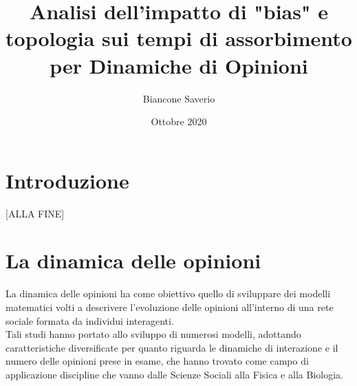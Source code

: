\documentclass{article}
\title{Analisi dell'impatto di "bias" e topologia sui tempi di assorbimento per Dinamiche di Opinioni}
\author{Biancone Saverio}
\date{Ottobre 2020}
\begin{document}
\maketitle

\section{Introduzione}
[ALLA FINE]
\section{La dinamica delle opinioni}
La dinamica delle opinioni ha come obiettivo quello di sviluppare dei modelli matematici volti a descrivere l'evoluzione delle opinioni all'interno di una rete sociale formata da individui interagenti.\\
Tali studi hanno portato allo sviluppo di numerosi modelli, adottando caratteristiche diversificate per quanto riguarda le dinamiche di interazione e il numero delle opinioni prese in esame, che hanno trovato come campo di applicazione discipline che vanno dalle Scienze Sociali alla Fisica e alla Biologia.
\end{document}
